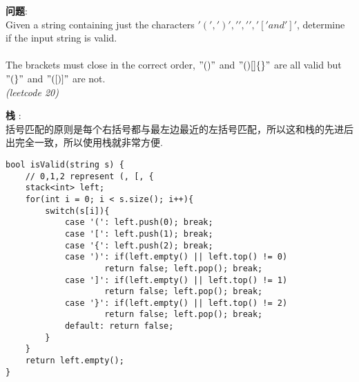    
\begin{description}
    \item{\textbf{问题}}:\\
Given a string containing just the characters $'(', ')', '{', '}', '[' and ']'$, determine if the input string is valid.\\
\\
The brackets must close in the correct order, $"()"$ and $"()[]\{\}"$ are all valid but $"(\}"$ and $"([)]"$ are not.\\
\textit{(leetcode 20)}
    \item{\textbf{栈}} : 
    \\括号匹配的原则是每个右括号都与最左边最近的左括号匹配，所以这和栈的先进后出完全一致，所以使用栈就非常方便.
    \begin{lstlisting}
bool isValid(string s) {
	// 0,1,2 represent (, [, {
	stack<int> left; 
	for(int i = 0; i < s.size(); i++){
		switch(s[i]){
			case '(': left.push(0); break;
			case '[': left.push(1); break;
			case '{': left.push(2); break;
			case ')': if(left.empty() || left.top() != 0)	
					return false; left.pop(); break;
			case ']': if(left.empty() || left.top() != 1)	
					return false; left.pop(); break;
			case '}': if(left.empty() || left.top() != 2)	
					return false; left.pop(); break;
			default: return false;
		}
	}
	return left.empty();
}
    \end{lstlisting}
\end{description}
